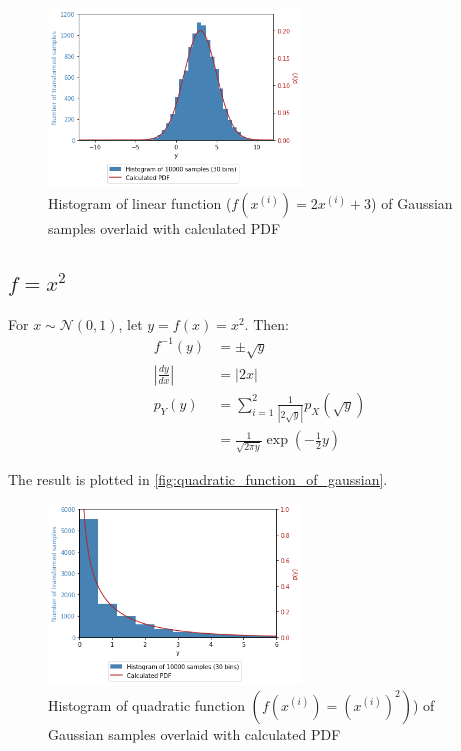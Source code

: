 \documentclass[a4paper]{article}
\begin{document}
\begin{figure}[h]
    \centering
    \includegraphics[width=0.6\textwidth]{figures/linear_function_of_gaussian.png}
    \caption{Histogram of linear function ($f(x^{(i)}) = 2x^{(i)} + 3$) of Gaussian samples overlaid with
    calculated PDF}
    \label{fig:linear_function_of_gaussian}
\end{figure}


\subsection{$f = x^2$}
For $x \sim \mathcal{N}(0, 1)$, let $y = f(x) = x ^ 2$. Then:
\begin{align*}
    f^{-1}(y) &= \pm \sqrt{y} \\
    \left|\frac{dy}{dx}\right| &= |2x| \\
    p_Y(y) &= \sum_{i=1}^{2} \frac{1}{|2 \sqrt{y}|} p_X \left( \sqrt{y} \right) \\
    &= \frac{1}{\sqrt{2\pi y}} \exp{\left( -\frac{1}{2} y \right)}
\end{align*}

The result is plotted in \autoref{fig:quadratic_function_of_gaussian}.

\begin{figure}[h]
\centering
\includegraphics[width=0.6\textwidth]{figures/quadratic_function_of_gaussian.png}
\caption{Histogram of quadratic function $\left(f(x^{(i)}) = \left(x^{(i)}\right)^2\right)$) of Gaussian samples
overlaid with calculated PDF}
\label{fig:quadratic_function_of_gaussian}
\end{figure}
\end{document}
